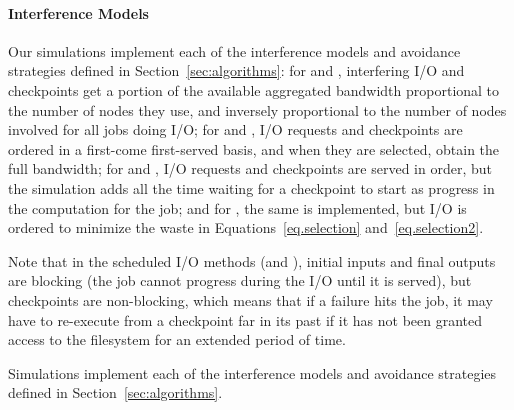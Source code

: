 
\ifTR

\paragraph*{Interference Models} Our simulations implement each of the
interference models and avoidance strategies defined in
Section~\ref{sec:algorithms}: for \propfixed and \propdaly,
interfering I/O and checkpoints get a portion of the available
aggregated bandwidth proportional to the number of nodes they use, and
inversely proportional to the number of nodes involved for all
jobs doing I/O; for \bfifofixed and \bfifodaly, I/O requests
and checkpoints are ordered in a first-come first-served basis, and
when they are selected, obtain the full bandwidth; for \fifofixed and
\fifodaly, I/O requests and checkpoints are served in order, but the
simulation adds all the time waiting for a checkpoint to start as
progress in the computation for the job; and for \cooperative,
the same is implemented, but I/O is ordered to minimize the waste in
Equations~\eqref{eq.selection} and~\eqref{eq.selection2}.

Note that in the scheduled I/O methods (\fifononblock and \cooperative),
initial inputs and final outputs are blocking (the job cannot progress during
the I/O until it is served), but checkpoints are non-blocking, which means that
if a failure hits the job, it may have to re-execute from a checkpoint far in
its past if it has  not been granted access to the filesystem for an extended
period of time.

\else

Simulations implement each of the interference models and avoidance
strategies defined in Section~\ref{sec:algorithms}.
\fi

